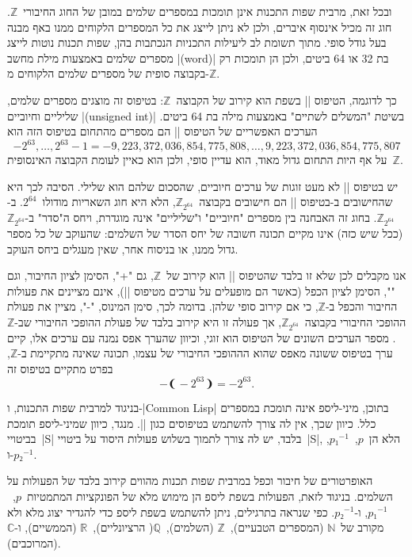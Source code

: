 ובכל זאת, מרבית שפות התכנות אינן תומכות במספרים שלמים במובן של החוג
החיבורי~$ℤ$. חוג זה מכיל אינסוף איברים, ולכן לא ניתן לייצג את כל המספרים
הלקוחים ממנו באף מבנה בעל גודל סופי. מתוך תשומת לב ליעילות התכניות הנכתבות בהן,
שפות תכנות נוטות לייצג מספרים שלמים באמצעות מילת מחשב \E|(word)| בת 32 או 64
ביטים, ולכן הן תומכות רק בקבוצה סופית של מספרים שלמים הלקוחים מ-$ℤ$.

כך לדוגמה, הטיפוס \E|| בשפת \Java הוא קירוב של הקבוצה~$ℤ$: בטיפוס זה מוצגים
מספרים שלמים, שליליים וחיוביים \E|(unsigned int)| בשיטת "המשלים לשתיים" באמצעות מילה בת
64 ביטים.
הערכים האפשריים של הטיפוס \E|| הם מספרים מהתחום
בטיפוס הזה הוא \begin{equation}
-2^{63},…,2^{63}-1=-9,223,372,036,854,775,808,…,9,223,372,036,854,775,807
\end{equation}
על אף היות התחום גדול מאוד, הוא עדיין סופי, ולכן הוא כאיין לעומת
הקבוצה האינסופית~$ℤ$.

יש בטיפוס \E|| לא מעט זוגות של ערכים חיוביים, שהסכום שלהם הוא שלילי.
הסיבה לכך היא שהחישובים ב-\CPL בטיפוס \E|| הם חישובים
בקבוצה~$ℤ_{2^{64}}$, הלא היא חוג השאריות מודולו~$2^{64}$. ב-$ℤ_{2^{64}}$. בחוג
זה האבחנה בין מספרים "חיוביים" ו"שליליים" אינה מוגדרת, ויחס ה"סדר"
ב-$ℤ_{2^{64}}$ (ככל שיש כזה) אינו מקיים תכונה חשובה של יחס הסדר של השלמים:
שהעוקב של כל מספר גדול ממנו, או בניסוח אחר, שאין מעגלים ביחס העוקב.

אנו מקבלים לכן שלא זו בלבד שהטיפוס \E|| הוא קירוב של~$ℤ$, גם "\cc+",
הסימן לציון החיבור, וגם "\cc*", הסימן לציון הכפל \Java (כאשר הם
מופעלים על ערכים מטיפוס \E||), אינם מציינים את פעולות החיבור והכפל
ב-$ℤ$, כי אם קירוב סופי שלהן. בדומה לכך, סימן המינוס, "\cc-", מציין את פעולת
ההופכי החיבורי בקבוצה~$ℤ_{2^{64}}$, אך פעולה זו היא קירוב בלבד של פעולת ההופכי
החיבורי שב-$ℤ$. מספר הערכים השונים של הטיפוס  הוא זוגי, וכיוון
שהערך אפס נמנה עם ערכים אלו, קיים ערך בטיפוס ששונה מאפס שהוא הההופכי החיבורי של
עצמו,
תכונה שאינה מתקיימת ב-$ℤ$, בפרט מתקיים בטיפוס זה \begin{equation*}
-❨-2^{63}❩=-2^{63}.
\end{equation*}

בניגוד למרבית שפות התכנות, ו-\E|Common Lisp| בתוכן, מיני-ליספ אינה תומכת
במספרים כלל. כיוון שכך, אין לה צורך להשתמש בטיפוסים כגון \E||. מנגד,
כיוון שמיני-ליספ תומכת בביטויי~\E|S| בלבד, יש לה צורך לתמוך בשלוש פעולות היסוד
על ביטויי~\E|S|, הלא הן~$p$,~$p₁^{-1}$, ו-$p₂^{-1}$.

האופרטורים של חיבור וכפל במרבית שפות תכנות מהווים קירוב בלבד של הפעולות על
השלמים. בניגוד לזאת, הפעולות בשפת ליספ הן מימוש מלא של הפונקציות
המתמטיות~$p$,~$p₁^{-1}$, ו-$p₂^{-1}$. כפי שנראה בתרגילים, ניתן להשתמש בשפת
ליספ כדי להגדיר יצוג מלא ולא מקורב של~$ℕ$ (המספרים הטבעיים),~$ℤ$ (השלמים),~$ℚ$(
הרציונליים),~$ℝ$ (הממשיים), ו-$ℂ$ (המרוכבים).

